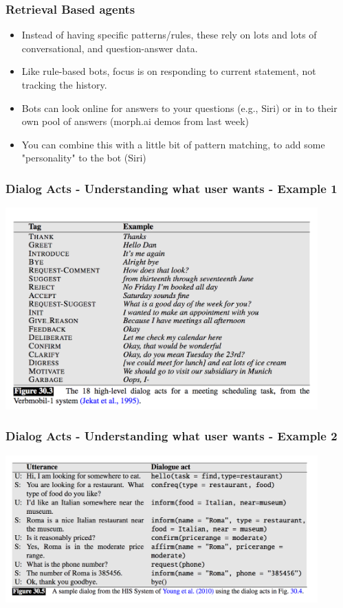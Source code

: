 \documentclass{beamer}
\begin{document}
\begin{frame}
\frametitle{Retrieval Based agents}
\begin{itemize}
\item Instead of having specific patterns/rules, these rely on lots and lots of conversational, and question-answer data.
\item Like rule-based bots, focus is on responding to current statement, not tracking the history.
\item Bots can look online for answers to your questions (e.g., Siri) or in to their own pool of answers (morph.ai demos from last week)
\item You can combine this with a little bit of pattern matching, to add some "personality" to the bot (Siri)
\end{itemize}
\end{frame}

\begin{frame}
\frametitle{Dialog Acts - Understanding what user wants - Example 1}
\includegraphics[width=0.9\textwidth]{dialogact1.png}
\end{frame}

\begin{frame}
\frametitle{Dialog Acts - Understanding what user wants - Example 2}
\includegraphics[width=0.9\textwidth]{dialogact2.png}
\end{frame}
\end{document}
